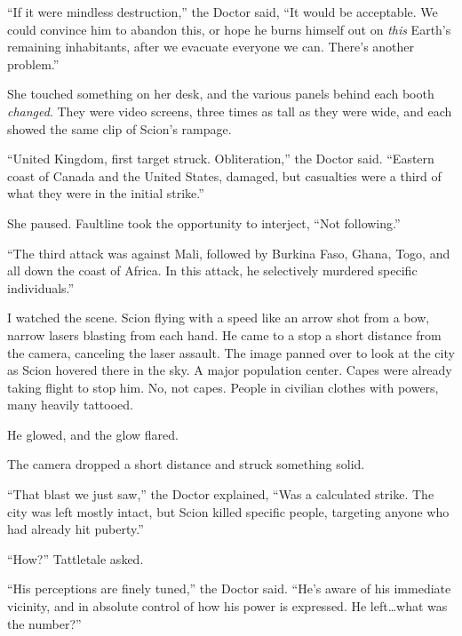``If it were mindless destruction,'' the Doctor said, ``It would be acceptable.  We could convince him to abandon this, or hope he burns himself out on \emph{this} Earth's remaining inhabitants, after we evacuate everyone we can.  There's another problem.''



She touched something on her desk, and the various panels behind each booth \emph{changed}.  They were video screens, three times as tall as they were wide, and each showed the same clip of Scion's rampage.



``United Kingdom, first target struck.  Obliteration,'' the Doctor said.  ``Eastern coast of Canada and the United States, damaged, but casualties were a third of what they were in the initial strike.''



She paused.  Faultline took the opportunity to interject, ``Not following.''



``The third attack was against Mali, followed by Burkina Faso, Ghana, Togo, and all down the coast of Africa.   In this attack, he selectively murdered specific individuals.''



I watched the scene.  Scion flying with a speed like an arrow shot from a bow, narrow lasers blasting from each hand.  He came to a stop a short distance from the camera, canceling the laser assault.  The image panned over to look at the city as Scion hovered there in the sky.  A major population center.  Capes were already taking flight to stop him.  No, not capes.  People in civilian clothes with powers, many heavily tattooed.



He glowed, and the glow flared.



The camera dropped a short distance and struck something solid.



``That blast we just saw,'' the Doctor explained, ``Was a calculated strike.  The city was left mostly intact, but Scion killed specific people, targeting anyone who had already hit puberty.''



``How?'' Tattletale asked.



``His perceptions are finely tuned,'' the Doctor said.  ``He's aware of his immediate vicinity, and in absolute control of how his power is expressed.  He left\ldots what was the number?''



